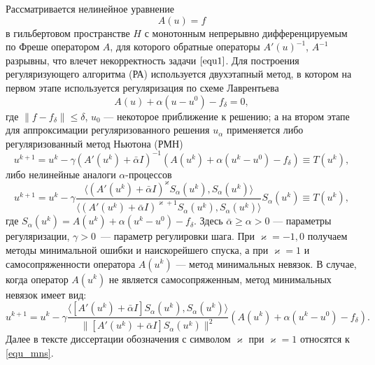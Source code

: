 Рассматривается нелинейное уравнение
\begin{equation}\label{equ1}A(u)=f\end{equation}
в гильбертовом пространстве $H$ с монотонным непрерывно дифференцируемым по Фреше оператором $A$, для которого обратные операторы $A'(u)^{-1}$, $A^{-1}$ разрывны, что влечет некорректность задачи $\eqref{equ1}$. Для построения регуляризующего алгоритма (РА) используется двухэтапный метод, в котором на первом этапе используется регуляризация по схеме Лаврентьева
\begin{equation}\label{equ2}A(u)+\alpha(u-u^0)-f_\delta=0,\end{equation}
где $\|f-f_\delta\|\le\delta$, $u_0$ --- некоторое приближение к решению; а на втором этапе для аппроксимации регуляризованного решения $u_\alpha$ применяется либо регуляризованный метод Ньютона (РМН)
\begin{equation}\label{equ_rmn}
u^{k+1}=u^k-\gamma(A'(u^k)+\bar\alpha I)^{-1}(A(u^k)+\alpha(u^k-u^0)-f_\delta)\equiv{T(u^k)},
\end{equation}
либо нелинейные аналоги $\alpha$-процессов
\begin{equation}\label{equ_alphaproc}
u^{k+1}=u^k-\gamma\frac{\langle (A'(u^k)+\bar\alpha I)^{\varkappa}S_\alpha(u^k), S_\alpha(u^k)\rangle }{\langle(A'(u^k)+\bar\alpha I)^{\varkappa+1}S_\alpha(u^k), S_\alpha(u^k)\rangle }S_\alpha(u^k)\equiv{T(u^k)},
\end{equation}
где $S_\alpha(u^k)=A(u^k)+\alpha(u^k-u^0)-f_\delta$. Здесь $\bar\alpha \ge \alpha >0$ --- параметры регуляризации, $\gamma>0$~--- параметр регулировки шага. При $\varkappa=-1,0$ получаем методы минимальной ошибки и наискорейшего спуска, а при $\varkappa=1$ и самосопряженности оператора $A(u^k)$ --- метод минимальных невязок.    
В случае, когда оператор $A(u^k)$ не является самосопряженным, метод минимальных невязок имеет вид:
\begin{equation}\label{equ_mns}
u^{k+1} =u^k - \gamma\frac{\langle [A'(u^k)+\bar{\alpha}I]S_\alpha(u^k), S_\alpha (u^k)\rangle}{\|[A'(u^k)+\bar{\alpha}I]S_\alpha(u^k)\|^2}(A(u^k)+\alpha(u^k-u^0)-f_\delta).
\end{equation}
Далее в тексте диссертации обозначения с символом $\varkappa$ при $\varkappa=1$ относятся к \eqref{equ_mns}.

